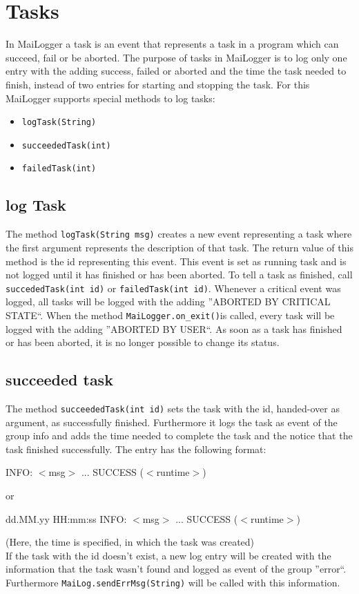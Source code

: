 \documentclass{article}
\begin{document}
\section{Tasks}
\label{tasks}
    In MaiLogger a task is an event that represents a task in a program which can succeed, fail or be aborted.
    The purpose of tasks in MaiLogger is to log only one entry with the adding success, failed or aborted and the time the task needed to finish, instead of two entries for starting and stopping the task.
    For this MaiLogger supports special methods to log tasks:
    \begin{itemize}
        \item \lstinline|logTask(String)|
        \item \lstinline|succeededTask(int)|
        \item \lstinline|failedTask(int)|
    \end{itemize}

    \subsection{log Task}
    \label{task_logTask}
    The method \lstinline|logTask(String msg)| creates a new event representing a task where the first argument represents the description of that task.
    The return value of this method is the id representing this event.
    This event is set as running task and is not logged until it has finished or has been aborted.
    To tell a task as finished, call \lstinline|succededTask(int id)| or \lstinline|failedTask(int id)|.
    Whenever a critical event was logged, all tasks will be logged with the adding ''ABORTED BY CRITICAL STATE``.
    When the method \lstinline|MaiLogger.on_exit()|is called, every task will be logged with the adding ''ABORTED BY USER``.
    As soon as a task has finished or has been aborted, it is no longer possible to change its status.

    \subsection{succeeded task}
    \label{task_succeededTask}
    The method \lstinline|succeededTask(int id)| sets the task with the id, handed-over as argument, as successfully finished.
    Furthermore it logs the task as event of the group info and adds the time needed to complete the task and the notice that the task finished successfully.
    The entry has the following format:
    \begin{description}
        \item INFO: $<$msg$>$ ... SUCCESS ($<$runtime$>$)
        \item or
        \item dd.MM.yy HH:mm:ss INFO: $<$msg$>$ ... SUCCESS ($<$runtime$>$)
    \end{description}
    (Here, the time is specified, in which the task was created) \\
    If the task with the id doesn't exist, a new log entry will be created with the information that the task wasn't found and logged as event of the group ''error``.
    Furthermore \lstinline|MaiLog.sendErrMsg(String)| will be called with this information.
\end{document}
